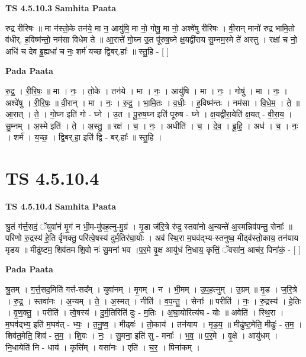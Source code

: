 \documentclass[17pt]{extarticle}
\begin{document}
\textbf{TS 4.5.10.3 } \newline
\textbf{Samhita Paata} \newline

रुद्र रीरिषः ॥ मा न॑स्तो॒के तन॑ये॒ मा न॒ आयु॑षि॒ मा नो॒ गोषु॒ मा नो॒ अश्वे॑षु रीरिषः । वी॒रान् मानो॑ रुद्र भामि॒तो व॑धीर्. ह॒विष्म॑न्तो॒ नम॑सा विधेम ते ॥ आ॒रात्ते॑ गो॒घ्न उ॒त पू॑रुष॒घ्ने क्ष॒यद्वी॑राय सु॒म्नम॒स्मे ते॑ अस्तु । रक्षा॑ च नो॒ अधि॑ च देव ब्रू॒ह्यधा॑ च नः॒ शर्म॑ यच्छ द्वि॒बर्.हाः᳚ ॥ स्तु॒हि - [  ] \newline

\textbf{Pada Paata} \newline

रु॒द्र॒ । री॒रि॒षः॒ ॥ मा । नः॒ । तो॒के । तन॑ये । मा । नः॒ । आयु॑षि । मा । नः॒ । गोषु॑ । मा । नः॒ । अश्वे॑षु । री॒रि॒षः॒ ॥ वी॒रान् । मा । नः॒ । रु॒द्र॒ । भा॒मि॒तः । व॒धीः॒ । ह॒विष्म॑न्तः । नम॑सा । वि॒धे॒म॒ । ते॒ ॥ आ॒रात् । ते॒ । गो॒घ्न इति॑ गो - घ्ने । उ॒त । पू॒रु॒ष॒घ्न इति॑ पूरुष - घ्ने । क्ष॒यद्वी॑रा॒येति॑ क्ष॒यत् - वी॒रा॒य॒ । सु॒म्नम् । अ॒स्मे इति॑ । ते॒ । अ॒स्तु॒ ॥ रक्ष॑ । च॒ । नः॒ । अधीति॑ । च॒ । दे॒व॒ । ब्रू॒हि॒ । अध॑ । च॒ । नः॒ । शर्म॑ । य॒च्छ॒ । द्वि॒बर्.हा॒ इति॑ द्वि - बर्.हाः᳚ ॥ स्तु॒हि ।  \newline





\section{ TS 4.5.10.4 }

\textbf{TS 4.5.10.4 } \newline
\textbf{Samhita Paata} \newline

श्रु॒तं ग॑र्त्त॒सदं॒ ॅयुवा॑नं मृ॒गं न भी॒म-मु॑पह॒त्नु-मु॒ग्रं । मृ॒डा ज॑रि॒त्रे रु॑द्र॒ स्तवा॑नो अ॒न्यन्ते॑ अ॒स्मन्निव॑पन्तु॒ सेनाः᳚ ॥ परि॑णो रु॒द्रस्य॑ हे॒ति र्वृ॑णक्तु॒ परि॑त्वे॒षस्य॑ दुर्म॒तिर॑घा॒योः । अव॑ स्थि॒रा म॒घव॑द्भ्य-स्तनुष्व॒ मीढ्व॑स्तो॒काय॒ तन॑याय मृडय ॥ मीढु॑ष्टम॒ शिव॑तम शि॒वो नः॑ सु॒मना॑ भव ।प॒र॒मे वृ॒क्ष आयु॑धं नि॒धाय॒ कृत्तिं॒ ॅवसा॑न॒ आच॑र॒ पिना॑कं॒ - [  ] \newline

\textbf{Pada Paata} \newline

श्रु॒तम् । ग॒र्त्त॒सद॒मिति॑ गर्त्त-सद᳚म् । युवा॑नम् । मृ॒गम् । न । भी॒मम् । उ॒प॒ह॒त्नुम् । उ॒ग्रम् ॥ मृ॒ड । ज॒रि॒त्रे । रु॒द्र॒ । स्तवा॑नः । अ॒न्यम् । ते॒ । अ॒स्मत् । नीति॑ । व॒प॒न्तु॒ । सेनाः᳚ ॥ परीति॑ । नः॒ । रु॒द्रस्य॑ । हे॒तिः । वृ॒ण॒क्तु॒ । परीति॑ । त्वे॒षस्य॑ । दु॒र्म॒तिरिति॑ दुः - म॒तिः । अ॒घा॒योरित्य॑घ - योः ॥ अवेति॑ । स्थि॒रा । म॒घव॑द्भ्य॒ इति॑ म॒घव॑त् - भ्यः॒ । त॒नु॒ष्व॒ । मीढ्वः॑ । तो॒काय॑ । तन॑याय । मृ॒ड॒य॒ ॥ मीढु॑ष्ट॒मेति॒ मीढुः॑ - त॒म॒ । शिव॑त॒मेति॒ शिव॑ - त॒म॒ । शि॒वः । नः॒ । सु॒मना॒ इति॑ सु - मनाः᳚ । भ॒व॒ ॥ प॒र॒मे । वृ॒क्षे । आयु॑धम् । नि॒धायेति॑ नि - धाय॑ । कृत्ति᳚म् । वसा॑नः । एति॑ । च॒र॒ । पिना॑कम् ।  \newline
\end{document}
